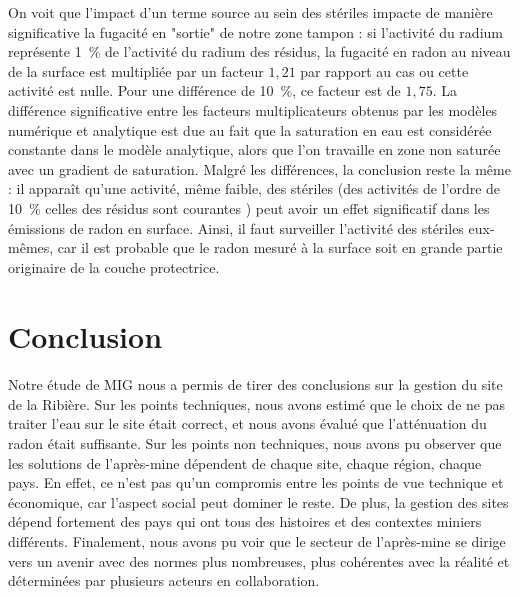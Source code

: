\documentclass{article}
\begin{document}
On voit que l'impact d'un terme source au sein des stériles impacte de manière significative la fugacité en "sortie" de notre zone tampon : si l'activité du radium représente 1~\% de l'activité du radium des résidus, la fugacité en radon au niveau de la surface est multipliée par un facteur $1,21$ par rapport au cas ou cette activité est nulle. Pour une différence de 10~\%, ce facteur est de $1,75$. La différence significative entre les facteurs multiplicateurs obtenus par les modèles numérique et analytique est due au fait que la saturation en eau est considérée constante dans le modèle analytique, alors que l'on travaille en zone non saturée avec un gradient de saturation. Malgré les différences, la conclusion reste la même : il apparaît qu'une activité, même faible, des stériles (des activités de l'ordre de 10~\% celles des résidus sont courantes \cite{ferry_evaluation_2002}) peut avoir un effet significatif dans les émissions de radon en surface. Ainsi, il faut surveiller l'activité des stériles eux-mêmes, car il est probable que le radon mesuré à la surface soit en grande partie originaire de la couche protectrice.


\newpage
\section*{Conclusion}

\paragraph{} Notre étude de MIG nous a permis de tirer des conclusions sur la gestion du site de la Ribière. Sur les points techniques, nous avons estimé que le choix de ne pas traiter l'eau sur le site était correct, et nous avons évalué que l'atténuation du radon était suffisante. Sur les points non techniques, nous avons pu observer que les solutions de l'après-mine dépendent de chaque site, chaque région, chaque pays. En effet, ce n'est pas qu'un compromis entre les points de vue technique et économique, car l'aspect social peut dominer le reste. De plus, la gestion des sites dépend fortement des pays qui ont tous des histoires et des contextes miniers différents. Finalement, nous avons pu voir que le secteur de l'après-mine se dirige vers un avenir avec des normes plus nombreuses, plus cohérentes avec la réalité et déterminées par plusieurs acteurs en collaboration.
\end{document}
